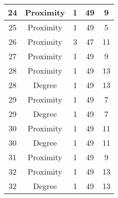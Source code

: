 \documentclass[results.tex]{subfiles}
\begin{document}
\begin{center}
\begin{tabular}{| c || c | c | c | c |}
            \hline
            24                      & Proximity                    & 1                      & 49                      & 9                    \\
            \hline
            25                      & Proximity                    & 1                      & 49                      & 5                    \\
            \hline
            26                      & Proximity                    & 3                      & 47                      & 11                   \\
            \hline
            27                      & Proximity                    & 1                      & 49                      & 9                    \\
            \hline
            28                      & Proximity                    & 1                      & 49                      & 13                   \\
            \hline
            28                      & Degree                       & 1                      & 49                      & 13                   \\
            \hline
            29                      & Proximity                    & 1                      & 49                      & 7                    \\
            \hline
            29                      & Degree                       & 1                      & 49                      & 7                    \\
            \hline
            30                      & Proximity                    & 1                      & 49                      & 11                   \\
            \hline
            30                      & Degree                       & 1                      & 49                      & 11                   \\
            \hline
            31                      & Proximity                    & 1                      & 49                      & 9                    \\
            \hline
            32                      & Proximity                    & 1                      & 49                      & 13                   \\
            \hline
            32                      & Degree                       & 1                      & 49                      & 13                   \\

\end{tabular}
\end{center}
\end{document}
